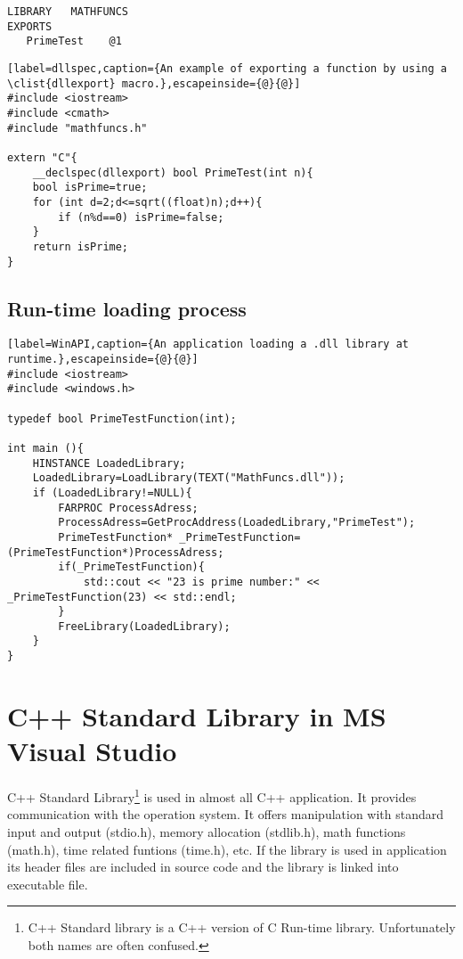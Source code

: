 \begin{lstlisting}[label=DEF,caption={A \clist{Module Definition File} of a library called ``Mathfuncs'' including a function called ``PrimeTest''.}]
LIBRARY   MATHFUNCS
EXPORTS
   PrimeTest	@1
\end{lstlisting}


\begin{lstlisting}[label=dllspec,caption={An example of exporting a function by using a \clist{dllexport} macro.},escapeinside={@}{@}]
#include <iostream>
#include <cmath>
#include "mathfuncs.h"

extern "C"{
	__declspec(dllexport) bool PrimeTest(int n){
	bool isPrime=true;
	for (int d=2;d<=sqrt((float)n);d++){
		if (n%d==0) isPrime=false;
	}
	return isPrime;
}
\end{lstlisting}

\subsection{Run-time loading process}

\label{sec:runtimeloading}

\begin{lstlisting}[label=WinAPI,caption={An application loading a .dll library at runtime.},escapeinside={@}{@}]
#include <iostream>
#include <windows.h>

typedef bool PrimeTestFunction(int);

int main (){
	HINSTANCE LoadedLibrary;
	LoadedLibrary=LoadLibrary(TEXT("MathFuncs.dll"));
	if (LoadedLibrary!=NULL){
		FARPROC ProcessAdress;
		ProcessAdress=GetProcAddress(LoadedLibrary,"PrimeTest");
		PrimeTestFunction* _PrimeTestFunction=(PrimeTestFunction*)ProcessAdress;
		if(_PrimeTestFunction){
			std::cout << "23 is prime number:" << _PrimeTestFunction(23) << std::endl;
		}
		FreeLibrary(LoadedLibrary);
	}
}
\end{lstlisting}



\section{C++ Standard Library in MS Visual Studio}

\label{standardlibrary}
C++ Standard Library\footnote{C++ Standard library is a C++ version of C Run-time library. Unfortunately both names are often confused.} is used in almost all C++ application. It provides communication with the operation system. It offers manipulation with standard input and output (stdio.h), memory allocation (stdlib.h), math functions (math.h), time related funtions (time.h), etc. If the library is used in application its header files are included in source code and the library is linked into executable file.

